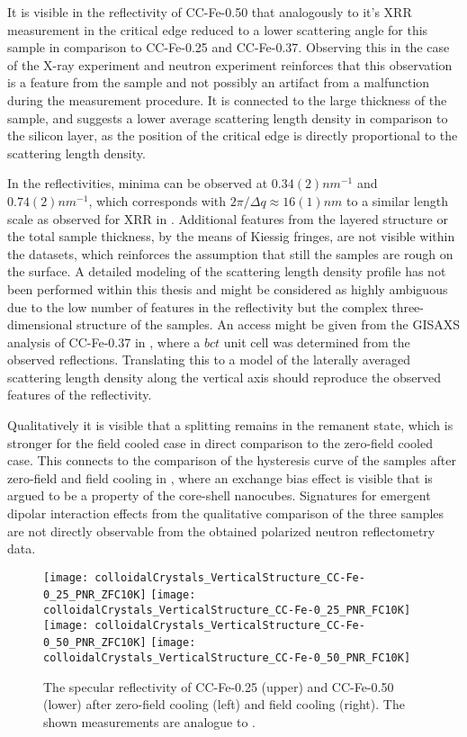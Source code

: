 \documentclass[\main/dresen_thesis.tex]{subfiles}
\begin{document}
  It is visible in the reflectivity of CC-Fe-0.50 that analogously to it's XRR measurement in  the critical edge reduced to a lower scattering angle for this sample in comparison to CC-Fe-0.25 and CC-Fe-0.37.
  Observing this in the case of the X-ray experiment and neutron experiment reinforces that this observation is a feature from the sample and not possibly an artifact from a malfunction during the measurement procedure.
  It is connected to the large thickness of the sample, and suggests a lower average scattering length density in comparison to the silicon layer, as the position of the critical edge is directly proportional to the scattering length density.

  In the reflectivities, minima can be observed at $0.34(2) \unit{nm^{-1}}$ and $0.74(2) \unit{nm^{-1}}$, which corresponds with $2 \pi / \Delta q \approx 16(1) \unit{nm}$ to a similar length scale as observed for XRR in .
  Additional features from the layered structure or the total sample thickness, by the means of Kiessig fringes, are not visible within the datasets, which reinforces the assumption that still the samples are rough on the surface.
  A detailed modeling of the scattering length density profile has not been performed within this thesis and might be considered as highly ambiguous due to the low number of features in the reflectivity but the complex three-dimensional structure of the samples.
  An access might be given from the GISAXS analysis of CC-Fe-0.37 in , where a $bct$ unit cell was determined from the observed reflections.
  Translating this to a model of the laterally averaged scattering length density along the vertical axis should reproduce the observed features of the reflectivity.

  Qualitatively it is visible that a splitting remains in the remanent state, which is stronger for the field cooled case in direct comparison to the zero-field cooled case.
  This connects to the comparison of the hysteresis curve of the samples after zero-field and field cooling in , where an exchange bias effect is visible that is argued to be a property of the core-shell nanocubes.
  Signatures for emergent dipolar interaction effects from the qualitative comparison of the three samples are not directly observable from the obtained polarized neutron reflectometry data.


  \begin{figure}[tb]
    \centering
    \texttt{[image: colloidalCrystals\_VerticalStructure\_CC-Fe-0\_25\_PNR\_ZFC10K]}
    \texttt{[image: colloidalCrystals\_VerticalStructure\_CC-Fe-0\_25\_PNR\_FC10K]}
    \texttt{[image: colloidalCrystals\_VerticalStructure\_CC-Fe-0\_50\_PNR\_ZFC10K]}
    \texttt{[image: colloidalCrystals\_VerticalStructure\_CC-Fe-0\_50\_PNR\_FC10K]}
    \caption{\label{fig:colloidalCrystals:pnrCCFe2550} The specular reflectivity of CC-Fe-0.25 (upper) and CC-Fe-0.50 (lower) after zero-field cooling (left) and field cooling (right). The shown measurements are analogue to .}
  \end{figure}
\end{document}
